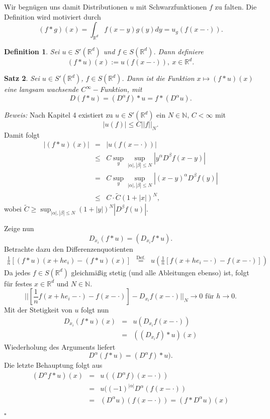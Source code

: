 \documentclass[11pt,a4paper,titlepage, ngerman]{scrartcl}
\newtheorem{Satz}{Satz}[section]
\newtheorem{Definition}[Satz]{Definition}
\numberwithin{equation}{section}
\newcommand{\R}{\mathbb{R}} %
\newcommand{\N}{\mathbb{N}} %
\newcommand{\m}{\cdot}
\newcommand{\Bew}{\emph{Beweis: }}
\newcommand{\qed}{\begin{flushright}
		$\square$
	\end{flushright}}
\begin{document}
	Wir begnügen uns damit Distributionen $u$ mit Schwarzfunktionen $f$ zu falten. Die Definition wird motiviert durch
	$$(f*g)(x)=\int_{\R^d}f(x-y)g(y) dy = u_g(f(x-\m)).$$
	
	\begin{Definition}
		Sei $u\in S'(\R^d)$ und $f\in S(\R^d)$. Dann definiere
		$$(f*u)(x):= u(f(x-\m)),~ x\in \R^d.$$
	\end{Definition}
	
	\begin{Satz}
		Sei $u\in S'(\R^d)$, $f\in S(\R^d)$. Dann ist die Funktion $x\mapsto (f*u)(x)$ eine langsam wachsende $C^\infty-$Funktion, mit 
		$$D(f*u) = (D^\alpha f)*u = f*(D^\alpha u).$$
	\end{Satz}
	
	\Bew Nach Kapitel 4 existiert zu $u\in S'(\R^d)$ ein $N\in \N$, $C<\infty$ mit 
	$$|u(f)|\leq C||f||_N.$$
	Damit folgt
	\begin{eqnarray}
		|(f*u)(x)| &=& |u(f(x-\m))|\nonumber\\
		&\leq& C\sup_y \sup_{|\alpha|,|\beta|\leq N}|y^\alpha D^\beta f(x-y)|\nonumber\\
		&=& C\sup_y\sup_{|\alpha|,|\beta|\leq N} |(x-y)^\alpha D^\beta f(y)|\nonumber\\
		&\leq& C\m \tilde{C}(1+|x|)^N, \nonumber
	\end{eqnarray}
	wobei $\tilde{C}\geq \sup_{|\alpha|,|\beta|\leq N}(1+|y|)^N|D^\beta f(u)|$.
	
	Zeige nun
	$$D_{x_i}(f*u) = (D_{x_i}f*u).$$
	Betrachte dazu den Differenzenquotienten
	\begin{eqnarray}
		\frac{1}{n}[(f*u)(x+h e_i)-(f*u)(x)] &\overset{\text{Def.}}{=}& u(\frac{1}{n}[f(x+he_i -\m)-f(x-\m)])\nonumber
	\end{eqnarray}
	Da jedes $f\in S(\R^d)$ gleichmäßig stetig (und alle Ableitungen ebenso) ist, folgt für festes $x\in \R^d$ und $N\in \N$.
	$$||[\frac{1}{n}f(x+he_i-\m)-f(x-\m)]-D_{x_i}f(x-\m)||_N\rightarrow 0\text{ für } h\rightarrow 0.$$
	Mit der Stetigkeit von $u$ folgt nun
	\begin{eqnarray}
		D_{x_i}(f*u)(x) &=& u(D_{x_i}f(x-\m))\nonumber\\
		&=& ((D_{x_i}f)*u)(x)\nonumber
	\end{eqnarray}
	Wiederholung des Arguments liefert
	$$D^\alpha (f*u) = (D^\alpha f)*u).$$
	Die letzte Behauptung folgt aus 
	\begin{eqnarray}
		(D^\alpha f*u)(x) &=& u((D^\alpha f)(x-\m))\nonumber\\
		&=& u((-1)^{|\alpha|}D^\alpha (f(x-\m))\nonumber\\
		&=& (D^\alpha u)(f(x-\m)) = (f*D^\alpha u)(x)\nonumber
	\end{eqnarray}
	\qed
	
\end{document}
